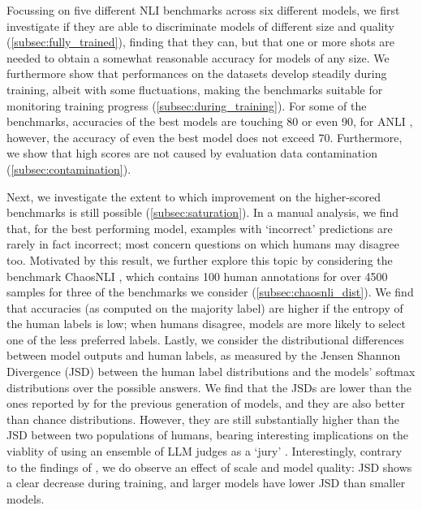 Focussing on five different NLI benchmarks across six different models, we first investigate if they are able to discriminate models of different size and quality (\cref{subsec:fully_trained}), finding that they can, but that one or more shots are needed to obtain a somewhat reasonable accuracy for models of any size.
We furthermore show that performances on the datasets develop steadily during training, albeit with some fluctuations, making the benchmarks suitable for monitoring training progress (\cref{subsec:during_training}).
For some of the benchmarks, accuracies of the best models are touching 80 or even 90, for ANLI \citep{nie-etal-2020-adversarial}, however, the accuracy of even the best model does not exceed 70.
Furthermore, we show that high scores are not caused by evaluation data contamination (\cref{subsec:contamination}).

Next, we investigate the extent to which improvement on the higher-scored benchmarks is still possible (\cref{subsec:saturation}).
In a manual analysis, we find that, for the best performing model, examples with `incorrect' predictions are rarely in fact incorrect; most concern questions on which humans may disagree too.
Motivated by this result, we further explore this topic by considering the benchmark ChaosNLI \citep{nie-etal-2020-learn}, which contains 100 human annotations for over 4500 samples for three of the benchmarks we consider (\cref{subsec:chaosnli_dist}).
We find that accuracies (as computed on the majority label) are higher if the entropy of the human labels is low; when humans disagree, models are more likely to select one of the less preferred labels.
Lastly, we consider the distributional differences between model outputs and human labels, as measured by the Jensen Shannon Divergence (JSD) between the human label distributions and the models' softmax distributions over the possible answers.
We find that the JSDs are lower than the ones reported by \citet{nie-etal-2020-learn} for the previous generation of models, and they are also better than chance distributions. 
However, they are still substantially higher than the JSD between two populations of humans, bearing interesting implications on the viablity of using an ensemble of LLM judges as a `jury' \citep[e.g.][]{verga2024replacing}.
Interestingly, contrary to the findings of \citet{nie-etal-2020-learn}, we do observe an effect of scale and model quality: JSD shows a clear decrease during training, and larger models have lower JSD than smaller models.

